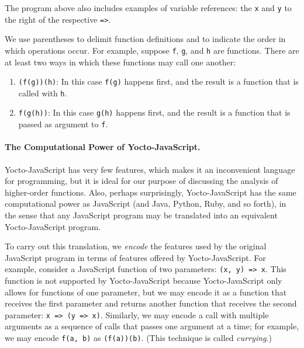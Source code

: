 \documentclass[12pt, oneside]{book}
\begin{document}
The program above also includes examples of variable references: the \texttt{x} and \texttt{y} to the right of the respective \texttt{=>}.

We use parentheses to delimit function definitions and to indicate the order in which operations occur. For example, suppose \texttt{f}, \texttt{g}, and \texttt{h} are functions. There are at least two ways in which these functions may call one another:

\begin{enumerate}
\item \texttt{(f(g))(h)}: In this case \texttt{f(g)} happens first, and the result is a function that is called with \texttt{h}.

\item \texttt{f(g(h))}: In this case \texttt{g(h)} happens first, and the result is a function that is passed as argument to \texttt{f}.
\end{enumerate}

\paragraph{The Computational Power of Yocto-JavaScript.}

Yocto-JavaScript has very few features, which makes it an inconvenient language for programming, but it is ideal for our purpose of discussing the analysis of higher-order functions. Also, perhaps surprisingly, Yocto-JavaScript has the same computational power as JavaScript (and Java, Python, Ruby, and so forth), in the sense that any JavaScript program may be translated into an equivalent Yocto-JavaScript program.

To carry out this translation, we \emph{encode} the features used by the original JavaScript program in terms of features offered by Yocto-JavaScript. For example, consider a JavaScript function of two parameters: \texttt{(x, y) => x}. This function is not supported by Yocto-JavaScript because Yocto-JavaScript only allows for functions of one parameter, but we may encode it as a function that receives the first parameter and returns another function that receives the second parameter: \texttt{x => (y => x)}. Similarly, we may encode a call with multiple arguments as a sequence of calls that passes one argument at a time; for example, we may encode \texttt{f(a, b)} as \texttt{(f(a))(b)}. (This technique is called \emph{currying}.)
\end{document}
